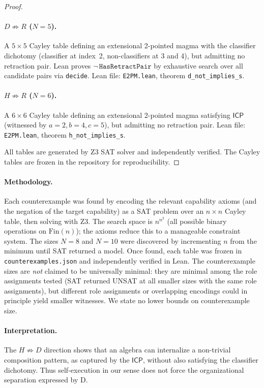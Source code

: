 \documentclass[sigconf,screen]{acmart}
\newcommand{\ICP}{\textsf{ICP}}
\newcommand{\Fin}{\mathrm{Fin}}
\theoremstyle{remark}
\begin{document}
\begin{proof}
\paragraph{$D \not\Rightarrow R$ ($N\!=\!5$).}
A $5 \times 5$ Cayley table defining an extensional 2-pointed magma with the classifier dichotomy (classifier at index~2, non-classifiers at 3 and 4), but admitting no retraction pair. Lean proves $\neg\,\texttt{HasRetractPair}$ by exhaustive search over all candidate pairs via \texttt{decide}. Lean file: \texttt{E2PM.lean}, theorem \texttt{d\_not\_implies\_s}.

\paragraph{$H \not\Rightarrow R$ ($N\!=\!6$).}
A $6 \times 6$ Cayley table defining an extensional 2-pointed magma satisfying $\ICP$ (witnessed by $a\!=\!2, b\!=\!4, c\!=\!5$), but admitting no retraction pair. Lean file: \texttt{E2PM.lean}, theorem \texttt{h\_not\_implies\_s}.

All tables are generated by Z3 SAT solver and independently verified. The Cayley tables are frozen in the repository for reproducibility.
\end{proof}

\paragraph{Methodology.}
Each counterexample was found by encoding the relevant capability axioms (and the negation of the target capability) as a SAT problem over an $n \times n$ Cayley table, then solving with Z3. The search space is $n^{n^2}$ (all possible binary operations on $\Fin(n)$); the axioms reduce this to a manageable constraint system. The sizes $N\!=\!8$ and $N\!=\!10$ were discovered by incrementing $n$ from the minimum until SAT returned a model. Once found, each table was frozen in \texttt{counterexamples.json} and independently verified in Lean. The counterexample sizes are \emph{not} claimed to be universally minimal: they are minimal among the role assignments tested (SAT returned UNSAT at all smaller sizes with the same role assignments), but different role assignments or overlapping encodings could in principle yield smaller witnesses. We state no lower bounds on counterexample size.

\paragraph{Interpretation.}
The $H \not\Rightarrow D$ direction shows that an algebra can internalize a non-trivial composition pattern, as captured by the $\ICP$, without also satisfying the classifier dichotomy. Thus self-execution in our sense does not force the organizational separation expressed by D.
\end{document}
